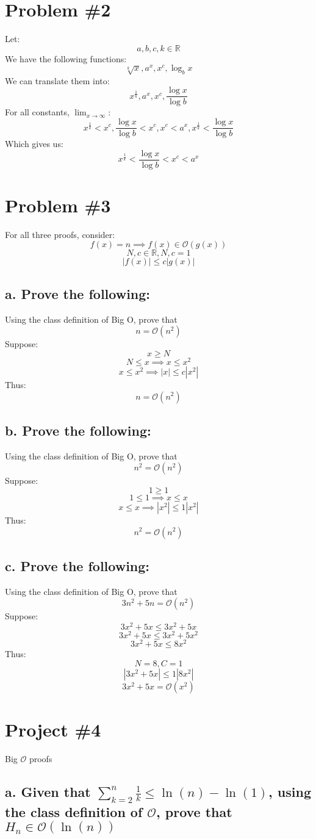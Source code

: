 \documentclass{article}
\newcommand {\R}{\mathbb{R}}
\begin{document}
\section*{Problem \#2}
Let: \[a, b, c, k \in \R \]
We have the following functions: \[ \sqrt[k]{x}, a^x, x^c, \log_b{x} \]
We can translate them into: \[ x^\frac{1}{k}, a^x, x^c, \frac{\log{x}}{\log{b}} \]
For all constants, \(\lim_{x\to\infty}\): \[
    x^\frac{1}{k} < x^c,
    \frac{\log{x}}{\log{b}} < x^c,
    x^c < a^x,
    x^\frac{1}{k} < \frac{\log{x}}{\log{b}}
\]
Which gives us: \[ x^\frac{1}{k} < \frac{\log{x}}{\log{b}} < x^c < a^x \]

\section*{Problem \#3}
For all three proofs, consider:
\[ f(x) = n \implies f(x) \in \mathcal{O}(g(x)) \]
\[ N, c \in \R, N, c = 1 \]
\[ |f(x)| \leq c|g(x)| \]
\subsection*{a. Prove the following:}
Using the class definition of Big O, prove that \[ n = \mathcal{O}(n^2) \]
Suppose:
\[x \geq N \]
\[N \leq x \implies x \leq x^2 \]
\[x \leq x^2 \implies |x| \leq c|x^2| \]
Thus:
\[n = \mathcal{O}(n^2) \]
\subsection*{b. Prove the following:}
Using the class definition of Big O, prove that \[ n^2 = \mathcal{O}(n^2) \]
Suppose:
\[1 \geq 1 \]
\[1 \leq 1 \implies x \leq x \]
\[x \leq x \implies |x^2| \leq 1|x^2| \]
Thus:
\[n^2 = \mathcal{O}(n^2) \]
\subsection*{c. Prove the following:}
Using the class definition of Big O, prove that \[ 3n^2 + 5n = \mathcal{O}(n^2) \]
Suppose:
\[3x^2 + 5x \leq 3x^2 + 5x \]
\[3x^2 + 5x \leq 3x^2 + 5x^2 \]
\[3x^2 + 5x \leq 8x^2 \]
Thus:
\[N = 8, C = 1\]
\[|3x^2 + 5x| \leq 1|8x^2|\]
\[3x^2 + 5x = \mathcal{O}(x^2)\]

\section*{Project \#4}
Big \(\mathcal{O}\) proofs

\subsection*{a. Given that \(\sum_{k=2}^n \frac{1}{k} \leq \ln{(n)} - \ln{(1)}\), using the class definition of \(\mathcal{O}\), prove that \(H_n \in \mathcal{O}(\ln{(n)})\)}
\end{document}
